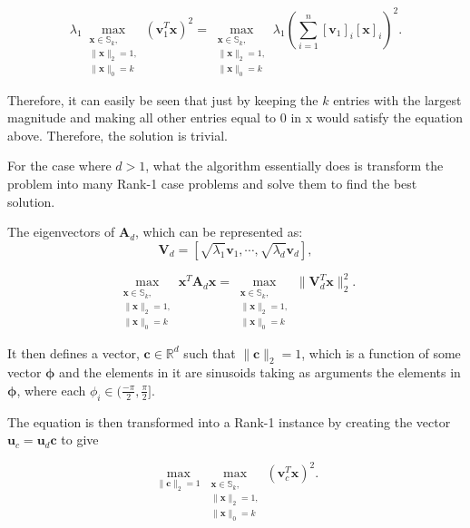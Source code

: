 \documentclass[11pt,a4paper]{article}
\begin{document}
\begin{equation*}
\lambda_1\max_{\substack{\mathbf{x} \in\mathbb{S}_k, \\ \|\mathbf{x}\|_2 = 1, \\ \|\mathbf{x}\|_0 = k}} \left(\mathbf{v}_1^T \mathbf{x}\right)^2 = \max_{\substack{\mathbf{x} \in\mathbb{S}_k, \\ \|\mathbf{x}\|_2 = 1, \\ \|\mathbf{x}\|_0 = k}} \lambda_1\left( \sum_{i = 1}^n [\mathbf{v}_{1}]_i [\mathbf{x}]_i\right)^2.
\end{equation*}

Therefore, it can easily be seen that just by keeping the $k$ entries with the largest magnitude and making all other entries equal to 0 in x would satisfy the equation above. Therefore, the solution is trivial. 

For the case where $d > 1$, what the algorithm essentially does is transform the problem into many Rank-1 case problems and solve them to find the best solution.

The eigenvectors of $\mathbf{A}_d$, which can be represented as:
\begin{equation*}
\mathbf{V}_d = [\sqrt{\lambda_1}\mathbf{v}_1, \cdots, \sqrt{\lambda_d}\mathbf{v}_d],
\end{equation*}

\begin{equation*}
\max_{\substack{\mathbf{x} \in\mathbb{S}_k, \\ \|\mathbf{x}\|_2 = 1, \\ \|\mathbf{x}\|_0 = k}}  \mathbf{x}^T\mathbf{A}_d\mathbf{x} = \max_{\substack{\mathbf{x} \in\mathbb{S}_k, \\ \|\mathbf{x}\|_2 = 1, \\ \|\mathbf{x}\|_0 = k}} \|\mathbf{V}_d^T\mathbf{x}\|_2^2.
\end{equation*}


It then defines a vector, $\mathbf{c} \in \mathbb{R}^d$ such that $\|\mathbf{c}\|_2=1$, which is a function of some vector $\mathbf{\phi}$ and the elements in it are sinusoids taking as arguments the elements in $\mathbf{\phi}$, where each $\phi_i \in (\frac{-\pi}{2}, \frac{\pi}{2}]$.

The equation is then transformed into a Rank-1 instance by creating the vector $\mathbf{u}_c = \mathbf{u}_d \mathbf{c}$ to give 

\begin{equation}
\max_{\|\mathbf{c}\|_2 =1} \max_{\substack{\mathbf{x} \in\mathbb{S}_k, \\ \|\mathbf{x}\|_2 = 1, \\ \|\mathbf{x}\|_0 = k}}\left(\mathbf{v}_c^T \mathbf{x}\right)^2.
\label{spannogram}
\end{equation}
\end{document}

